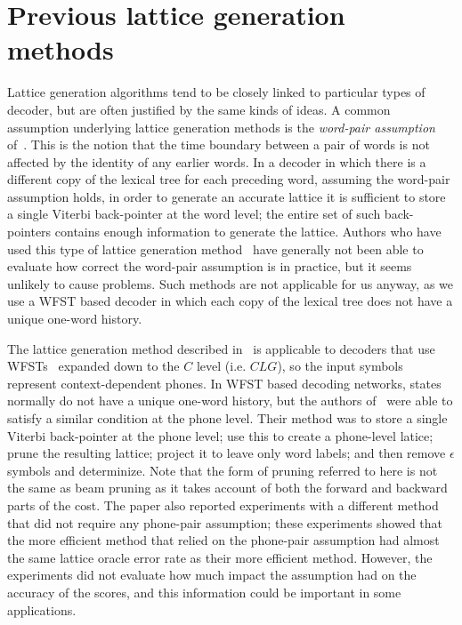 \documentclass{article}
\begin{document}
\section{Previous lattice generation methods}
\label{sec:previous}

Lattice generation algorithms tend to be closely linked to particular types of decoder,
but are often justified by the same kinds of ideas.
A common assumption underlying lattice generation methods is the {\em word-pair assumption}
of~\cite{ney_word_graph}.  This is the notion that the time boundary between a pair of words
is not affected by the identity of any earlier words.  In a decoder in which there is
a different copy of the lexical tree for each preceding word, 
assuming the word-pair assumption holds, in order to generate an accurate lattice it is
sufficient to store a single Viterbi back-pointer at the word level; the entire set of
such back-pointers contains enough information to generate the lattice.  Authors who have used
this type of lattice generation method~\cite{ney_word_graph,odell_thesis} have generally
not been able to evaluate how correct the word-pair assumption is in practice, but it seems
unlikely to cause problems.  Such methods are not applicable for us anyway, as we
use a WFST based decoder in which each copy of the lexical tree does not have a unique
one-word history.

The lattice generation method described in~\cite{efficient_general} 
is applicable to decoders that use WFSTs~\cite{wfst}
expanded down to the $C$ level (i.e. $CLG$), so the input symbols represent
context-dependent phones.  In WFST based decoding networks, states normally do
not have a unique one-word history, but the authors of~\cite{efficient_general}
were able to satisfy a similar condition at the phone level.  Their method was
to store a single Viterbi back-pointer at the phone level; use this to 
create a phone-level latice; prune the resulting
lattice; project it to leave only word labels; and then remove $\epsilon$
symbols and determinize.
Note that the form of pruning referred to here is not the same as beam pruning as
it takes account of both the forward and backward parts of the cost.
The paper also reported experiments with a different method that did not require any
phone-pair assumption; these experiments showed that the more
efficient method that relied on the phone-pair assumption
had almost the same lattice oracle error rate as their more efficient method.  However, the 
experiments did not evaluate how much impact the assumption had on the accuracy of the scores, 
and this information could be important in some applications.
\end{document}
